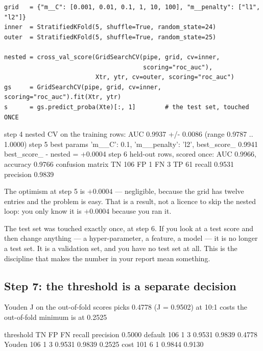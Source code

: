 \documentclass[11pt]{article}
\begin{document}
\begin{lstlisting}
grid   = {"m__C": [0.001, 0.01, 0.1, 1, 10, 100], "m__penalty": ["l1", "l2"]}
inner  = StratifiedKFold(5, shuffle=True, random_state=24)
outer  = StratifiedKFold(5, shuffle=True, random_state=25)

nested = cross_val_score(GridSearchCV(pipe, grid, cv=inner,
                                      scoring="roc_auc"),
                         Xtr, ytr, cv=outer, scoring="roc_auc")
gs     = GridSearchCV(pipe, grid, cv=inner, scoring="roc_auc").fit(Xtr, ytr)
s      = gs.predict_proba(Xte)[:, 1]        # the test set, touched ONCE
\end{lstlisting}
\begin{codeout}
step 4  nested CV on the training rows: AUC 0.9937 +/- 0.0086
        (range 0.9787 .. 1.0000)
step 5  best params {'m__C': 0.1, 'm__penalty': 'l2'}, best_score_ 0.9941
        best_score_ - nested = +0.0004
step 6  held-out rows, scored once: AUC 0.9966, accuracy 0.9766
        confusion matrix  TN 106  FP 1  FN 3  TP 61
        recall 0.9531   precision 0.9839
\end{codeout}

The optimism at step 5 is $+0.0004$ --- negligible, because the grid has
twelve entries and the problem is easy. That is a result, not a licence to
skip the nested loop: you only know it is $+0.0004$ because you ran it.

\begin{caution}
The test set was touched exactly once, at step 6. If you look at a test score
and then change anything --- a hyper-parameter, a feature, a model --- it is
no longer a test set. It is a validation set, and you have no test set at
all. This is the discipline that makes the number in your report mean
something.
\end{caution}

\subsection{Step 7: the threshold is a separate decision}

\begin{codeout}
Youden J on the out-of-fold scores picks 0.4778 (J = 0.9502)
at 10:1 costs the out-of-fold minimum is at 0.2525

threshold           TN      FP      FN    recall  precision
0.5000 default     106       1       3    0.9531     0.9839
0.4778 Youden      106       1       3    0.9531     0.9839
0.2525 cost        101       6       1    0.9844     0.9130
\end{codeout}
\end{document}
